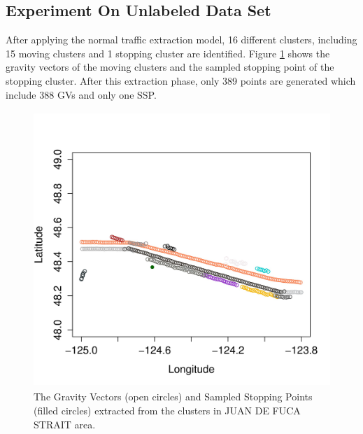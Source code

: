 \documentclass[12pt,glossary]{dalcsthesis}
\begin{document}
\subsection{Experiment On Unlabeled Data Set}
\label{sec:exp_2.1}

After applying the normal traffic extraction model, 16 different clusters, including 15 moving clusters and 1 stopping cluster are identified. %
Figure \ref{fig:jdfk_gv2} shows the gravity vectors of the moving clusters and the sampled stopping point of the stopping cluster. After this extraction phase, only 389 points are generated which include 388 GVs and only one SSP. %

\begin{figure}[!htb]
\centering
\includegraphics[width=5in,height=4.1in]{jdfk_clusters_new.jpg}
\caption{The Gravity Vectors (open circles) and Sampled Stopping Points (filled circles) extracted from the clusters in JUAN DE FUCA STRAIT area.}
\label{fig:jdfk_gv2}
\end{figure}
\end{document}
